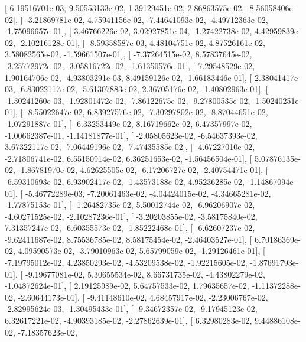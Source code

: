 \documentclass{article}
\begin{document}
       [  6.19516701e-03,   9.50553133e-02,   1.39129451e-02,
          2.86863575e-02,  -8.56058406e-02],
       [ -3.21869781e-02,   4.75941156e-02,  -7.44641093e-02,
         -4.49712363e-02,  -1.75096657e-01],
       [  3.46766226e-02,   3.02927851e-04,  -1.27422738e-02,
          4.42959839e-02,  -2.10216128e-01],
       [ -8.59358587e-03,   4.48104751e-02,   4.87526161e-02,
          3.58082565e-02,  -1.59661507e-01],
       [ -7.37264515e-02,   8.57837645e-02,  -3.25772972e-02,
         -3.05816722e-02,  -1.61350576e-01],
       [  7.29548529e-02,   1.90164706e-02,  -4.93803291e-03,
          8.49159126e-02,  -1.66183446e-01],
       [  2.38041417e-03,  -6.83022117e-02,  -5.61307883e-02,
          2.36705176e-02,  -1.40802963e-01],
       [ -1.30241260e-03,  -1.92801472e-02,  -7.86122675e-02,
         -9.27800535e-02,  -1.50240251e-01],
       [ -8.55022647e-02,   6.83927576e-02,  -7.30297802e-02,
         -8.87044651e-02,  -1.07291887e-01],
       [ -6.33253449e-02,   8.16719662e-02,   6.47357997e-02,
         -1.00662387e-01,  -1.14181877e-01],
       [ -2.05805623e-02,  -6.54637393e-02,   3.67322117e-02,
         -7.06449196e-02,  -7.47435585e-02],
       [ -4.67227010e-02,  -2.71806741e-02,   6.55150914e-02,
          6.36251653e-02,  -1.56456504e-01],
       [  5.07876135e-02,  -1.86781970e-02,   4.62625505e-02,
         -6.17206727e-02,  -2.40754471e-01],
       [ -6.59310693e-02,   6.93902417e-02,  -1.43573188e-02,
          4.95236285e-02,  -1.14867094e-01],
       [ -5.46772289e-03,  -7.20061463e-02,  -4.04424015e-02,
         -4.34665281e-02,  -1.77875153e-01],
       [ -1.26482735e-02,   5.50012744e-02,  -6.96206907e-02,
         -4.60271525e-02,  -2.10287236e-01],
       [ -3.20203855e-02,  -3.58175840e-02,   7.31357247e-02,
         -6.60355573e-02,  -1.85222468e-01],
       [ -6.62607237e-02,  -9.62411687e-02,   8.75536785e-02,
          8.58175454e-02,  -2.46403527e-01],
       [  6.70186369e-02,   4.09590573e-02,  -3.79010963e-02,
          5.65799059e-02,  -1.29126461e-01],
       [ -7.19795012e-02,   4.23850293e-02,  -4.53209538e-02,
         -1.92215605e-02,  -1.87691793e-01],
       [ -9.19677081e-02,   5.30655534e-02,   8.66731735e-02,
         -4.43802279e-02,  -1.04872624e-01],
       [  2.19125989e-02,   5.64757533e-02,   1.79635657e-02,
         -1.11372288e-02,  -2.60644173e-01],
       [ -9.41148610e-02,   4.68457917e-02,  -2.23006767e-02,
         -2.82995624e-03,  -1.30495433e-01],
       [ -9.34672357e-02,  -9.17945123e-02,   6.32617221e-02,
         -4.90393185e-02,  -2.27862639e-01],
       [  6.32980283e-02,   9.44886108e-02,  -7.18357623e-02,
\end{document}
